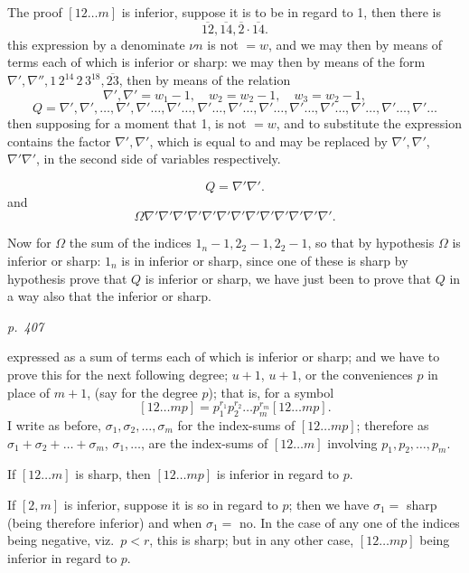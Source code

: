 \documentclass[11pt,a4paper]{article}
\theoremstyle{plain}
\theoremstyle{definition}
\begin{document}
The proof $[12 \ldots m]$ is inferior, suppose it is to be in regard to 1, then there is
\[
\overline{12}, \overline{14}, \overline{2} \cdot \overline{14}.
\]
this expression by a denominate $\nu n$ is not $= w$, and we may then by means of
terms each of which is inferior or sharp: we may then by means of
the form $\nabla', \nabla'', 1\,2^{14} \,2\,3^{18}, \overline{23}$, then by means of the relation
\[
\nabla', \nabla' = w_1 - 1, \quad w_2 = w_2 - 1, \quad w_3 = w_2 - 1,
\]
\[
Q = \nabla', \nabla', \ldots, \nabla', \nabla' \ldots, \nabla' \ldots, \nabla' \ldots, \nabla' \ldots, \nabla' \ldots, \nabla' \ldots, \nabla' \ldots, \nabla' \ldots, \nabla' \ldots, \nabla' \ldots
\]
then supposing for a moment that 1, is not $= w$, and to substitute the expression
contains the factor $\nabla', \nabla'$, which is equal to and may be replaced by $\nabla', \nabla'$, $\nabla' \nabla'$,
in the second side of variables respectively.

\[
Q = \nabla' \nabla'.
\]
and
\[
\Omega \nabla' \nabla' \nabla' \nabla' \nabla' \nabla' \nabla' \nabla' \nabla' \nabla' \nabla' \nabla' \nabla'.
\]

Now for $\Omega$ the sum of the indices $1_n - 1, 2_2 - 1, 2_2 - 1$, so that by hypothesis
$\Omega$ is inferior or sharp: $1_n$ is in inferior or sharp, since one of these is sharp by hypothesis
prove that $Q$ is inferior or sharp, we have just been to prove that $Q$ in a way also that
the inferior or sharp.

\clearpage

\bigskip
\textit{p.~407}
\smallskip

\noindent
expressed as a sum of terms each of which is inferior or sharp; and we have to
prove this for the next following degree; $u + 1$, $u + 1$, or the conveniences $p$ in place
of $m + 1$, (say for the degree $p$); that is, for a symbol
\[
[12 \ldots m p] = p_1^{r_1} p_2^{r_2} \ldots p_m^{r_m} [12 \ldots m p].
\]
I write as before, $\sigma_1, \sigma_2, \ldots, \sigma_m$ for the index-sums of $[12 \ldots m p]$; therefore as
$\sigma_1 + \sigma_2 + \ldots + \sigma_m$, $\sigma_1, \ldots$, are the index-sums of $[12 \ldots m]$ involving $p_1, p_2, \ldots, p_m$.

If $[12 \ldots m]$ is sharp, then $[12 \ldots m p]$ is inferior in regard to $p$.

If $[2, m]$ is inferior, suppose it is so in regard to $p$; then we have $\sigma_1 = $ sharp (being therefore
inferior) and when $\sigma_1 = $ no.  In the case of any one of the indices being negative,
viz.\ $p < r$, this is sharp; but in any other case, $[12 \ldots m p]$ being inferior in regard to $p$.
\end{document}
